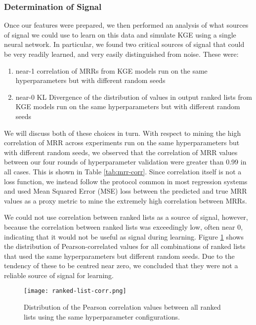 \subsubsection{Determination of Signal}
Once our features were prepared, we then performed an analysis of what sources of signal we could use to learn on this data and simulate KGE using a single neural network. In particular, we found two critical sources of signal that could be very readily learned, and very easily distinguished from noise. These were:
\begin{enumerate}
  \item near-1 correlation of MRRs from KGE models run on the same hyperparameters but with different random seeds
  \item near-0 KL Divergence of the distribution of values in output ranked lists from KGE models run on the same hyperparameters but with different random seeds
\end{enumerate}

We will discuss both of these choices in turn. With respect to mining the high correlation of MRR across experiments run on the same hyperparameters but with different random seeds, we observed that the correlation of MRR values between our four rounds of hyperparameter validation were greater than 0.99 in all cases. This is shown in Table \ref{tab:mrr-corr}. Since correlation itself is not a loss function, we instead follow the protocol common in most regression systems and used Mean Squared Error (MSE) loss between the predicted and true MRR values as a proxy metric to mine the extremely high correlation between MRRs. 

We could not use correlation between ranked lists as a source of signal, however, because the correlation between ranked lists was exceedingly low, often near 0, indicating that it would not be useful as signal during learning. Figure \ref{fig:rl-corr} shows the distribution of Pearson-correlated values for all combinations of ranked lists that used the same hyperparameters but different random seeds. Due to the tendency of these to be centred near zero, we concluded that they were not a reliable source of signal for learning.

\begin{figure}
    \centering
    \texttt{[image: ranked-list-corr.png]}
    \caption{Distribution of the Pearson correlation values between all ranked lists using the same hyperparameter configurations.}
    \label{fig:rl-corr}
\end{figure}

